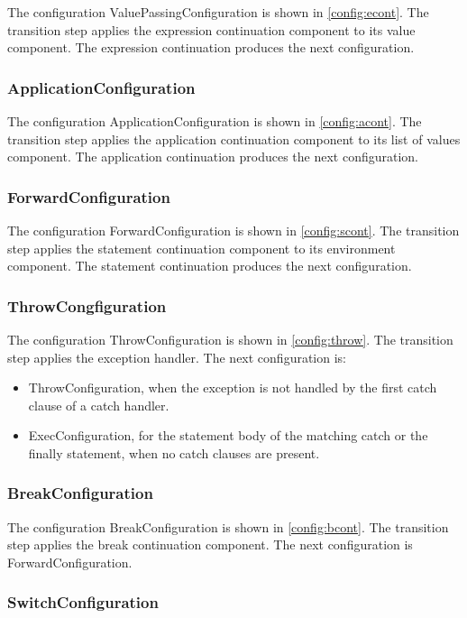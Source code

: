 \documentclass{article}
\begin{document}
The configuration ValuePassingConfiguration is shown in \ref{config:econt}.
The transition step applies the expression continuation component to its value component.
The expression continuation produces the next configuration.

\subsubsection{ApplicationConfiguration}
\label{subsubsec:applicationconfig}

The configuration ApplicationConfiguration is shown in \ref{config:acont}.
The transition step applies the application continuation component to its list of values component.
The application continuation produces the next configuration.
\subsubsection{ForwardConfiguration}
\label{subsubsec:forwardconfig}

The configuration ForwardConfiguration is shown in \ref{config:scont}.
The transition step applies the statement continuation component to its environment component.
The statement continuation produces the next configuration.

\subsubsection{ThrowCongfiguration}
\label{subsubsec:throwconfig}
The configuration ThrowConfiguration is shown in \ref{config:throw}.
The transition step applies the exception handler.
The next configuration is:
\begin{itemize}
\item ThrowConfiguration, when the exception is not handled by the first catch clause of a catch handler.
\item ExecConfiguration, for the statement body of the matching catch or the finally statement, when no catch clauses are present.
\end{itemize}
\subsubsection{BreakConfiguration}
\label{subsubsec:breakconfig}
The configuration BreakConfiguration is shown in \ref{config:bcont}.
The transition step applies the break continuation component.
The next configuration is ForwardConfiguration.
\subsubsection{SwitchConfiguration}
\label{subsubsec:switchconfig}
\end{document}
